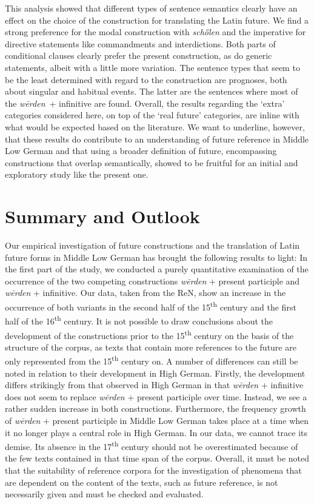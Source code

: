 \documentclass[output=paper,colorlinks,citecolor=brown]{langscibook}
\begin{document}
This analysis showed that different types of sentence semantics clearly have an effect on the choice of the construction for translating the Latin future. We find a strong preference for the modal construction with \textit{schȫlen} and the imperative for directive statements like commandments and interdictions. Both parts of conditional clauses clearly prefer the present construction, as do generic statements, albeit with a little more variation. The sentence types that seem to be the least determined with regard to the construction are prognoses, both about singular and habitual events. The latter are the sentences where most of the \textit{wērden}~+ infinitive are found. Overall, the results regarding the `extra' categories considered here, on top of the `real future' categories, are inline with what would be expected based on the literature. We want to underline, however, that these results do contribute to an understanding of future reference in Middle Low German and that using a broader definition of future, encompassing constructions that overlap semantically, showed to be fruitful for an initial and exploratory study like the present one. 

\section{Summary and Outlook}\label{chap:summary}
Our empirical investigation of future constructions and the translation of Latin
future forms in Middle Low German has brought the following results to light:
In the first part of the study, we conducted a purely quantitative examination of
the occurrence of the two competing constructions \textit{wērden} + present participle
and \textit{wērden} + infinitive. Our data, taken from the ReN, show an increase in the occurrence of both variants in the second half of the 15\textsuperscript{th} century and the first half of the 16\textsuperscript{th} century. It is not possible to draw conclusions about the development of the constructions prior to the 15\textsuperscript{th} century on the basis of the structure of the corpus, as texts that contain more references to the future are only represented from the 15\textsuperscript{th} century on. A number of differences can still be noted in relation to their development in High German. Firstly, the development differs strikingly from that observed in High German in that \textit{wērden} + infinitive does not seem to replace \textit{wērden} + present participle over time. Instead, we see a rather sudden increase in both constructions. Furthermore, the frequency growth of \textit{wērden} + present participle in Middle Low German takes place at a time when it no longer plays a central role in High German. In our data, we cannot trace its demise. Its absence in the 17\textsuperscript{th} century should not be overestimated because of the few texts contained in that time span of the corpus. Overall, it must be noted that the suitability of reference corpora for the investigation of phenomena that are dependent on the content of the texts, such as future reference, is not necessarily given and must be checked and evaluated. 
\end{document}

